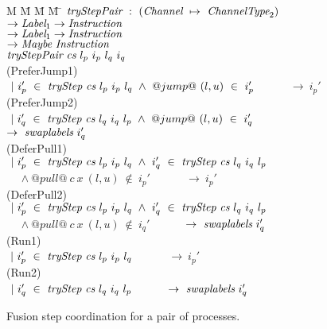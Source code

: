 
\newcommand\note[1]{\textcolor{notec}{(#1)}}

\begin{figure}
\begin{tabbing}
M \= M \= M \= M \= \kill
$\textit{tryStepPair} ~:~ (\textit{Channel} ~\mapsto~ \textit{ChannelType}_2)$ \\
\> \> \> \> $\to \textit{Label}_1 \to \textit{Instruction}$ \\
\> \> \> \> $\to \textit{Label}_1 \to \textit{Instruction}$ \\
\> \> \> \> $\to \textit{Maybe}~\textit{Instruction}$ \\
$\textit{tryStepPair} ~\textit{cs}~l_p~i_p~l_q~i_q$ \\

\> \note{PreferJump1} \\
\> $~|~i_p'~\in~\textit{tryStep}~\textit{cs}~l_p~i_p~l_q ~\wedge~@jump@~(l,u)~\in~i_p'$ 
   ~~~~~ $\to~i_p'$ \\
\> \note{PreferJump2} \\
\> $~|~i_q'~\in~\textit{tryStep}~\textit{cs}~l_q~i_q~l_p ~\wedge~@jump@~(l,u)~\in~i_q'$
   ~~~~~ $\to~\textit{swaplabels}~i_q'$ 
\\[0.5em]

\> \note{DeferPull1} \\
\> $~|~i_p'~\in~\textit{tryStep}~\textit{cs}~l_p~i_p~l_q ~\wedge~ i_q'~\in~\textit{tryStep}~\textit{cs}~l_q~i_q~l_p$ \\
\> ~~ $\wedge~@pull@~c~x~(l,u)~\not\in~i_p'$ 
   ~~~~~ $\to~i_p'$ \\
\> \note{DeferPull2} \\
\> $~|~i_p'~\in~\textit{tryStep}~\textit{cs}~l_p~i_p~l_q ~\wedge~i_q'~\in~\textit{tryStep}~\textit{cs}~l_q~i_q~l_p$ \\
\> ~~ $\wedge~@pull@~c~x~(l,u)~\not\in~i_q'$ 
   ~~~~~ $\to~\textit{swaplabels}~i_q'$ 
\\[0.5em]

\> \note{Run1} \\
\> $~|~i_p'~\in~\textit{tryStep}~\textit{cs}~l_p~i_p~l_q$ ~~~~~ $\to~i_p'$ \\
\> \note{Run2} \\
\> $~|~i_q'~\in~\textit{tryStep}~\textit{cs}~l_q~i_q~l_p$ ~~~~~ $\to~\textit{swaplabels}~i_q'$
\end{tabbing}
\caption{Fusion step coordination for a pair of processes.}
\label{fig:Fusion:Def:StepPair}
\end{figure}

